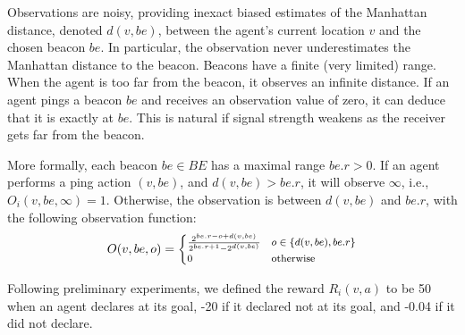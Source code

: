 \documentclass[letterpaper]{article} %
\newcommand{\roni}[1]{ }
\begin{document}
Observations are noisy, providing inexact biased estimates of the Manhattan distance, denoted $d(v,be)$, between the agent's current location $v$ and the chosen beacon $be$. %
In particular, the observation never underestimates the Manhattan distance to the beacon. Beacons have a finite (very limited) range. When the agent is too far from the beacon, it observes an infinite distance.
If an agent pings a beacon $be$ and receives an observation value of zero, it can deduce that it is exactly  at $be$. This is natural if signal strength weakens as the receiver gets far from the beacon.

More formally, each beacon $be\in BE$ has a maximal range $be.r>0$.
If an agent performs a ping action $(v,be)$, and $d(v,be)>be.r$, it will observe $\infty$, i.e., $O_i(v,be,\infty)=1$.
Otherwise, the observation is between $d(v, be)$ and $be.r$, with the following observation function:
\begin{equation}
\footnotesize
    O(v,be,o) =
    \begin{cases}
        \frac{2^{be.r-o+d(v,be)}}{2^{be.r+1}-2^{d(v,be)}} & o\in\{d(v,be), be.r\} \\
        0 & \text{otherwise}
    \end{cases}
\end{equation}

Following preliminary experiments, we defined the reward $R_i(v,a)$ to be 50 when an agent declares at its goal, -20 if it declared not at its goal, and -0.04 if it did not declare.



\end{document}

